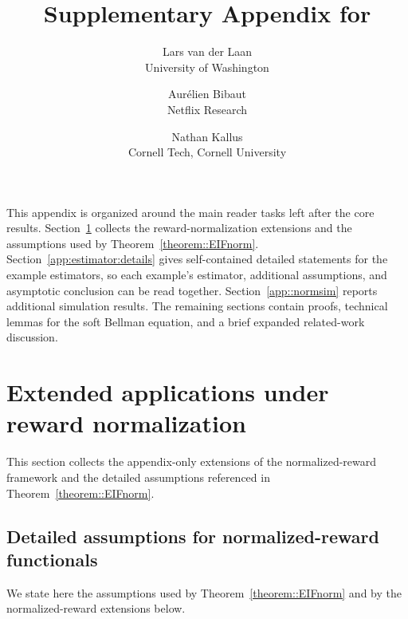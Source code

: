 \documentclass[11pt]{article}
\title{\bf Supplementary Appendix for \\ \JASATitleText}
\author{
  Lars van der Laan \\
  University of Washington \\
  \and
  Aur\'elien Bibaut \\
  Netflix Research \\
  \and
  Nathan Kallus \\
  Cornell Tech, Cornell University
}
\date{}
\theoremstyle{plain}
\def\spacingset#1{\renewcommand{\baselinestretch}{#1}\small\normalsize}
\begin{document}
\maketitle
\spacingset{1.15}
\appendix
 

This appendix is organized around the main reader tasks left after the core
results. Section~\ref{app::additionalapplications} collects the
reward-normalization extensions and the assumptions used by
Theorem~\ref{theorem::EIFnorm}. Section~\ref{app:estimator:details} gives
self-contained detailed statements for the example estimators, so each
example's estimator, additional assumptions, and asymptotic conclusion can be
read together. Section~\ref{app::normsim} reports additional simulation
results. The remaining sections contain proofs, technical lemmas for the soft
Bellman equation, and a brief expanded related-work discussion.


 
 
 

\section{Extended applications under reward normalization}
\label{app::additionalapplications}

This section collects the appendix-only extensions of the normalized-reward
framework and the detailed assumptions referenced in
Theorem~\ref{theorem::EIFnorm}.

\subsection{Detailed assumptions for normalized-reward functionals}
\label{appendix::conditionsEIFnorm}

We state here the assumptions used by Theorem~\ref{theorem::EIFnorm} and by
the normalized-reward extensions below.
\end{document}
